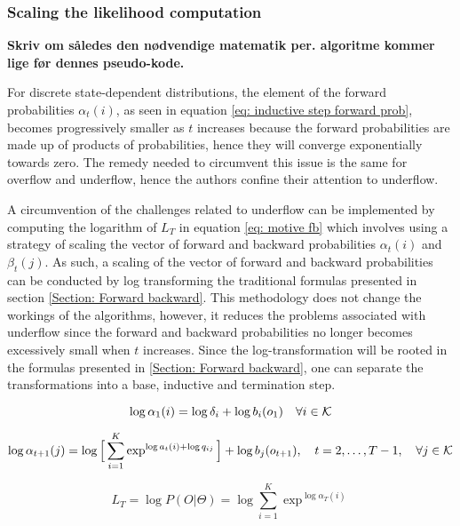 \subsubsection{Scaling the likelihood computation}
\textbf{Skriv om således den nødvendige matematik per. algoritme kommer lige før dennes pseudo-kode.}

For discrete state-dependent distributions, the element of the forward probabilities $\alpha_t(i)$, as seen in equation \ref{eq: inductive step forward prob}, becomes progressively smaller as $t$ increases because the forward probabilities are made up of products of probabilities, hence they will converge exponentially towards zero. The remedy needed to circumvent this issue is the same for overflow and underflow, hence the authors confine their attention to underflow.

A circumvention of the challenges related to underflow can be implemented by computing the logarithm of $L_T$ in equation \ref{eq: motive fb} which involves using a strategy of scaling the vector of forward and backward probabilities $\alpha_t(i)$ and $\beta_t(j)$. As such, a scaling of the vector of forward and backward probabilities can be conducted by log transforming the traditional formulas presented in section \ref{Section: Forward backward}. This methodology does not change the workings of the algorithms, however, it reduces the problems associated with underflow since the forward and backward probabilities no longer becomes excessively small when $t$ increases. Since the log-transformation will be rooted in the formulas presented in \ref{Section: Forward backward}, one can separate the transformations into a base, inductive and termination step.  

\begin{equation}
    \log\alpha_1(i) = \log\delta_i + \log b_i(o_1)
    \quad \forall i \in\operatorname{\mathcal{K}}
    \label{eq: log base case forward prob}
\end{equation}

\begin{equation}
    \log\alpha_{t+1}(j) = \log\Big[\sum_{i=1}^K \exp^{\log a_t(i)+\log q_{ij}}\Big] + \log b_j(o_{t+1}),
    \quad t=2,\ldots,T-1, 
    \quad \forall j \in\operatorname{\mathcal{K}}
    \label{eq: log inductive step forward prob}
\end{equation}

\begin{equation}
     L_T = \log P(O |\Theta) = \log\sum_{i=1}^K \exp^{\log\alpha_T(i)}
    \label{eq: log termination step}
\end{equation}

